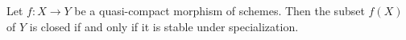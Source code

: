 Let $f: X \to Y$ be a quasi-compact morphism of schemes. Then the subset $f(X)$ of $Y$ is closed if and only if it is stable under specialization.
